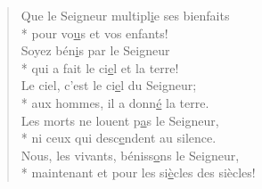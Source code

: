 \begin{verse}
Que le Seigneur multipl\underline{i}e ses bienfaits \\*
pour vo\underline{u}s et vos enfants! \\
Soyez bén\underline{i}s par le Seigneur \\*
qui a fait le ci\underline{e}l et la terre! \\
Le ciel, c’est le ci\underline{e}l du Seigneur; \\*
aux hommes, il a donn\underline{é} la terre. \\

Les morts ne louent p\underline{a}s le Seigneur, \\*
ni ceux qui desc\underline{e}ndent au silence. \\
Nous, les vivants, béniss\underline{o}ns le Seigneur, \\*
maintenant et pour les si\underline{è}cles des siècles! \\
\end{verse}

